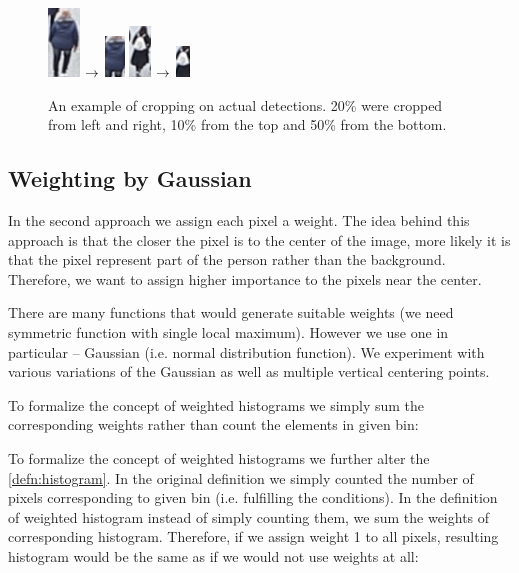 \begin{figure}
    \centering
    \includegraphics{img/background_filter/1_original.png} $\rightarrow$ \includegraphics{img/background_filter/1_small.png} \hspace{2cm} \includegraphics{img/background_filter/2_original.png} $\rightarrow$ \includegraphics{img/background_filter/2_small.png}
    \caption[An example of cropping on actual detections]{An example of cropping on actual detections. 20\% were cropped from left and right, 10\% from the top and 50\% from the bottom.}
    \label{fig:crop_example}
\end{figure}

\subsection{Weighting by Gaussian}

In the second approach we assign each pixel a weight. The idea behind this
approach is that the closer the pixel is to the center of the image, more likely
it is that the pixel represent part of the person rather than the background.
Therefore, we want to assign higher importance to the pixels near the center.

There are many functions that would generate suitable weights (we need symmetric
function with single local maximum). However we use one in particular
-- Gaussian (i.e. normal distribution function). We experiment with various
variations of the Gaussian as well as multiple vertical centering points.

To formalize the concept of weighted histograms we simply sum the corresponding
weights rather than count the elements in given bin:

To formalize the concept of weighted histograms we further alter the
\autoref{defn:histogram}. In the original definition we simply counted the
number of pixels corresponding to given bin (i.e. fulfilling the conditions).
In the definition of weighted histogram instead of simply counting them, we
sum the weights of corresponding histogram. Therefore, if we assign weight 1 to
all pixels, resulting histogram would be the same as if we would not use weights
at all:

